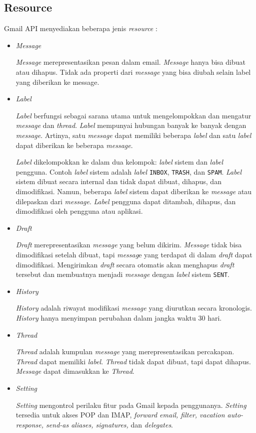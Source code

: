 \subsection{Resource}
Gmail API menyediakan beberapa jenis \textit{resource} :
\begin{itemize}
\item \textit{Message}

\textit{Message} merepresentasikan pesan dalam email. \textit{Message} hanya bisa dibuat atau dihapus. Tidak ada properti dari \textit{message} yang bisa diubah selain label yang diberikan ke message.

\item \textit{Label}

\textit{Label} berfungsi sebagai sarana utama untuk mengelompokkan dan mengatur \textit{message} dan \textit{thread}. \textit{Label} mempunyai hubungan banyak ke banyak dengan \textit{message}. Artinya, satu \textit{message} dapat memiliki beberapa \textit{label} dan satu \textit{label} dapat diberikan ke beberapa \textit{message}.

\textit{Label} dikelompokkan ke dalam dua kelompok: \textit{label} sistem dan \textit{label} pengguna. Contoh \textit{label} sistem adalah \textit{label} \texttt{INBOX}, \texttt{TRASH}, dan \texttt{SPAM}. \textit{Label} sistem dibuat secara internal dan tidak dapat dibuat, dihapus, dan dimodifikasi. Namun, beberapa \textit{label} sistem dapat diberikan ke \textit{message} atau dilepaskan dari \textit{message}. \textit{Label} pengguna dapat ditambah, dihapus, dan dimodifikasi oleh pengguna atau aplikasi.

\item \textit{Draft}

\textit{Draft} merepresentasikan \textit{message} yang belum dikirim. \textit{Message} tidak bisa dimodifikasi setelah dibuat, tapi \textit{messag}e yang terdapat di dalam \textit{draft} dapat dimodifikasi. Mengirimkan \textit{draft} secara otomatis akan menghapus \textit{draft} tersebut dan membuatnya menjadi \textit{message} dengan \textit{label} sistem \texttt{SENT}.

\item \textit{History}

\textit{History} adalah riwayat modifikasi \textit{message} yang diurutkan secara kronologis. \textit{History} hanya menyimpan perubahan dalam jangka waktu 30 hari.

\item \textit{Thread}

\textit{Thread} adalah kumpulan \textit{message} yang merepresentasikan percakapan. \textit{Thread} dapat memiliki \textit{label}. \textit{Thread} tidak dapat dibuat, tapi dapat dihapus. \textit{Message} dapat dimasukkan ke \textit{Thread}.

\item \textit{Setting}

\textit{Setting} mengontrol perilaku fitur pada Gmail kepada penggunanya. \textit{Setting} tersedia untuk akses POP dan IMAP, \textit{forward email, filter, vacation auto-response, send-as aliases, signatures,} dan \textit{delegates}.

\end{itemize}  

